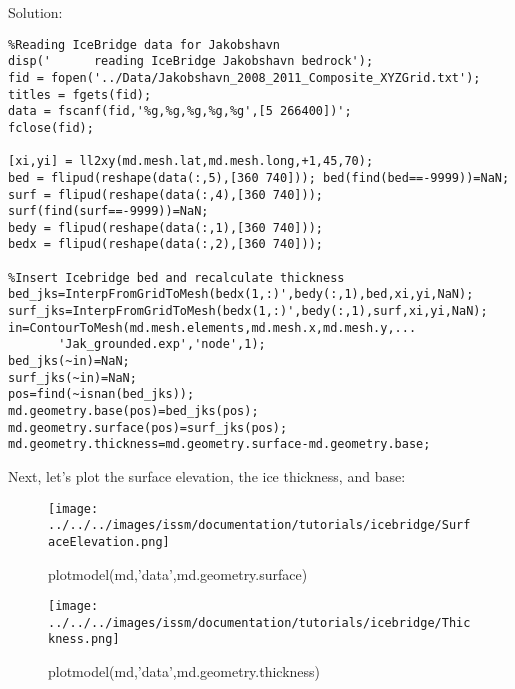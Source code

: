 Solution:
\begin{verbatim}%Reading IceBridge data for Jakobshavn
disp('      reading IceBridge Jakobshavn bedrock');
fid = fopen('../Data/Jakobshavn_2008_2011_Composite_XYZGrid.txt');
titles = fgets(fid); 
data = fscanf(fid,'%g,%g,%g,%g,%g',[5 266400])';
fclose(fid);

[xi,yi] = ll2xy(md.mesh.lat,md.mesh.long,+1,45,70);
bed = flipud(reshape(data(:,5),[360 740])); bed(find(bed==-9999))=NaN;
surf = flipud(reshape(data(:,4),[360 740])); surf(find(surf==-9999))=NaN;
bedy = flipud(reshape(data(:,1),[360 740]));
bedx = flipud(reshape(data(:,2),[360 740]));

%Insert Icebridge bed and recalculate thickness
bed_jks=InterpFromGridToMesh(bedx(1,:)',bedy(:,1),bed,xi,yi,NaN);
surf_jks=InterpFromGridToMesh(bedx(1,:)',bedy(:,1),surf,xi,yi,NaN);
in=ContourToMesh(md.mesh.elements,md.mesh.x,md.mesh.y,...
	   'Jak_grounded.exp','node',1);
bed_jks(~in)=NaN;
surf_jks(~in)=NaN;
pos=find(~isnan(bed_jks));
md.geometry.base(pos)=bed_jks(pos);
md.geometry.surface(pos)=surf_jks(pos);
md.geometry.thickness=md.geometry.surface-md.geometry.base;\end{verbatim}

Next, let's plot the surface elevation, the ice thickness, and base:
\begin{figure}[H]
	\begin{center}
	\texttt{[image: ../../../images/issm/documentation/tutorials/icebridge/SurfaceElevation.png]}
	\caption{plotmodel(md,'data',md.geometry.surface)}
	\end{center}
\end{figure}

\begin{figure}[H]
	\begin{center}
	\texttt{[image: ../../../images/issm/documentation/tutorials/icebridge/Thickness.png]}
	\caption{plotmodel(md,'data',md.geometry.thickness)}
	\end{center}
\end{figure}

